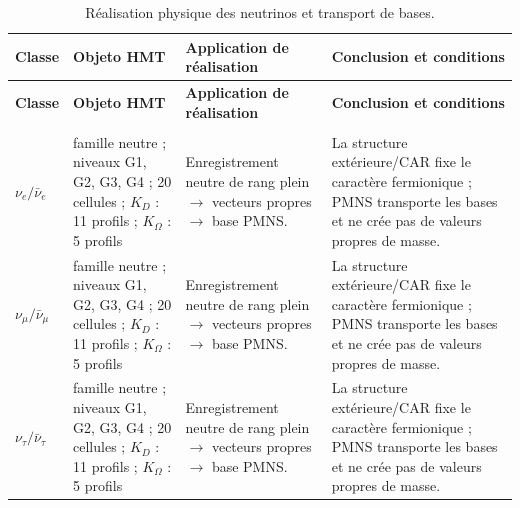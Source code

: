 \begingroup
\setlength{\tabcolsep}{4.5pt}
\renewcommand{\arraystretch}{1.28}
\begin{longtable}{@{}>{\raggedright\arraybackslash}p{}>{\raggedright\arraybackslash}p{}>{\raggedright\arraybackslash}p{}>{\raggedright\arraybackslash}p{}@{}}
\caption{Réalisation physique des neutrinos et transport de bases.}\label{tab:masas-realizacion-neutrinos}\\
\toprule
\textbf{Classe} & \textbf{Objeto HMT} & \textbf{Application de réalisation} & \textbf{Conclusion et conditions} \\
\midrule
\endfirsthead
\toprule
\textbf{Classe} & \textbf{Objeto HMT} & \textbf{Application de réalisation} & \textbf{Conclusion et conditions} \\
\midrule
\endhead
\midrule
\multicolumn{4}{r}{\footnotesize Suite à la page suivante.}\\
\endfoot
\bottomrule
\endlastfoot
$\nu_e/\bar\nu_e$ & famille neutre ; niveaux G1, G2, G3, G4 ; 20 cellules ; $K_D$ : 11 profils ; $K_\Omega$ : 5 profils & Enregistrement neutre de rang plein $\to$ vecteurs propres $\to$ base PMNS. & La structure extérieure/CAR fixe le caractère fermionique ; PMNS transporte les bases et ne crée pas de valeurs propres de masse. \\
$\nu_\mu/\bar\nu_\mu$ & famille neutre ; niveaux G1, G2, G3, G4 ; 20 cellules ; $K_D$ : 11 profils ; $K_\Omega$ : 5 profils & Enregistrement neutre de rang plein $\to$ vecteurs propres $\to$ base PMNS. & La structure extérieure/CAR fixe le caractère fermionique ; PMNS transporte les bases et ne crée pas de valeurs propres de masse. \\
$\nu_\tau/\bar\nu_\tau$ & famille neutre ; niveaux G1, G2, G3, G4 ; 20 cellules ; $K_D$ : 11 profils ; $K_\Omega$ : 5 profils & Enregistrement neutre de rang plein $\to$ vecteurs propres $\to$ base PMNS. & La structure extérieure/CAR fixe le caractère fermionique ; PMNS transporte les bases et ne crée pas de valeurs propres de masse. \\
\end{longtable}
\endgroup
